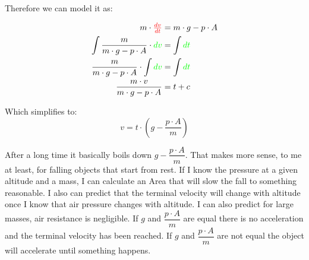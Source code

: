 \documentclass[12pt,letterpaper,final]{article}
\begin{document}
Therefore we can model it as:

\begin{equation}
\begin{align}
					m\cdot\color{red}\tfrac{dv}{dt}\color{black} &= m \cdot g - p \cdot A\\				
\int\dfrac{m}{m \cdot g - p \cdot A}\cdot \color{green}dv\color{black} &= \int \color{green}dt\color{black}\\
\dfrac{m}{m \cdot g - p \cdot A}\cdot \int \color{green}dv\color{black} &= \int \color{green}dt\color{black}\\
\dfrac{m \cdot v}{m \cdot g - p \cdot A} &= t + c\\
\end{align}
\end{equation}

Which simplifies to:
\begin{equation}
v = t \cdot \left(g - \dfrac{p \cdot A}{m} \right)
\end{equation}

After a long time it basically boils down $g - \dfrac{p \cdot A}{m}$. That makes more sense, to me at least, for falling objects that start from rest. If I know the pressure at a given altitude and a mass, I can calculate an Area that will slow the fall to something reasonable. I also can predict that the terminal velocity will change with altitude once I know that air pressure changes with altitude. I can also predict for large masses, air resistance is negligible. If $g$ and  $\dfrac{p \cdot A}{m}$ are equal there is no acceleration and the terminal velocity has been reached. If $g$ and $\dfrac{p \cdot A}{m}$ are not equal the object will accelerate until something happens.
\end{document}
